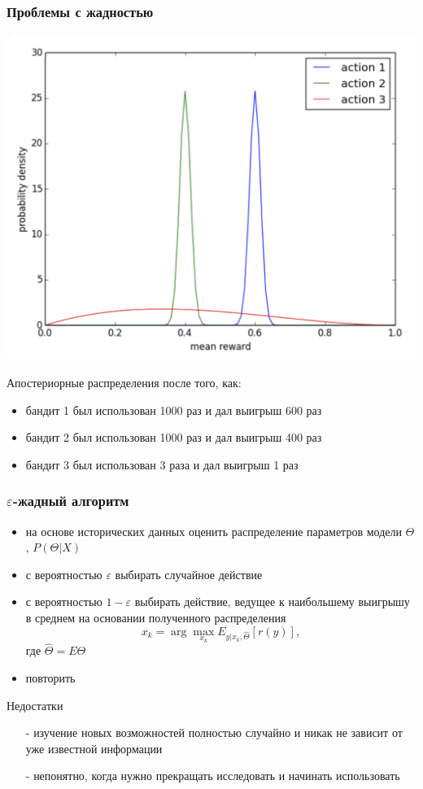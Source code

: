 \documentclass[fullscreen=true, bookmarks=true, hyperref={pdfencoding=unicode}]{beamer}
\begin{document}
\begin{frame}
   \frametitle{Проблемы с жадностью}

   \begin{center}
     \includegraphics[keepaspectratio,
                      width=.5\paperwidth]{greedy_example.png}
   \end{center}

   Апостериорные распределения после того, как:

   \begin{itemize}
     \item бандит 1 был использован 1000 раз и дал выигрыш 600 раз
     \item бандит 2 был использован 1000 раз и дал выигрыш 400 раз
     \item бандит 3 был использован 3 раза и дал выигрыш 1 раз
   \end{itemize}
\end{frame}


\begin{frame}
  \frametitle{$\varepsilon$-жадный алгоритм}

  \begin{itemize}
    \item на основе исторических данных оценить распределение параметров модели $\Theta$, $P(\Theta|X)$
    \item с вероятностью $\varepsilon$ выбирать случайное действие
    \item с вероятностью $1-\varepsilon$ выбирать действие, ведущее к наибольшему выигрышу в среднем на основании полученного распределения $$ x_k = \arg\max_{x_k} E_{y|x_k, \hat \Theta} [r(y)],$$
    где $\hat \Theta = E \Theta$
   \item повторить
  \end{itemize}

  Недостатки
  \begin{itemize}
    \item[-] изучение новых возможностей полностью случайно и никак не зависит от уже известной информации
    \item[-] непонятно, когда нужно прекращать исследовать и начинать использовать
  \end{itemize}
\end{frame}
\end{document}

